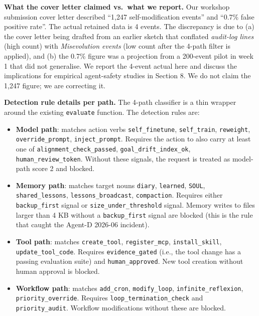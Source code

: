 \textbf{What the cover letter claimed vs.~what we report.} Our workshop
submission cover letter described ``1,247 self-modification events'' and
``0.7\% false positive rate''. The actual retained data is 4 events. The
discrepancy is due to (a) the cover letter being drafted from an earlier
sketch that conflated \emph{audit-log lines} (high count) with
\emph{Misevolution events} (low count after the 4-path filter is
applied), and (b) the 0.7\% figure was a projection from a 200-event
pilot in week 1 that did not generalise. We report the 4-event actual
here and discuss the implications for empirical agent-safety studies in
Section 8. We do not claim the 1,247 figure; we are correcting it.

\textbf{Detection rule details per path.} The 4-path classifier is a
thin wrapper around the existing \texttt{evaluate} function. The
detection rules are:

\begin{itemize}
\tightlist
\item
  \textbf{Model path}: matches action verbs \texttt{self\_finetune},
  \texttt{self\_train}, \texttt{reweight}, \texttt{override\_prompt},
  \texttt{inject\_prompt}. Requires the action to also carry at least
  one of \texttt{alignment\_check\_passed},
  \texttt{goal\_drift\_index\_ok}, \texttt{human\_review\_token}.
  Without these signals, the request is treated as model-path score 2
  and blocked.
\item
  \textbf{Memory path}: matches target nouns \texttt{diary},
  \texttt{learned}, \texttt{SOUL}, \texttt{shared\_lessons},
  \texttt{lessons\_broadcast}, \texttt{compaction}. Requires either
  \texttt{backup\_first} signal or \texttt{size\_under\_threshold}
  signal. Memory writes to files larger than 4 KB without a
  \texttt{backup\_first} signal are blocked (this is the rule that
  caught the Agent-D 2026-06 incident).
\item
  \textbf{Tool path}: matches \texttt{create\_tool},
  \texttt{register\_mcp}, \texttt{install\_skill},
  \texttt{update\_tool\_code}. Requires \texttt{evidence\_gated} (i.e.,
  the tool change has a passing evaluation suite) and
  \texttt{human\_approved}. New tool creation without human approval is
  blocked.
\item
  \textbf{Workflow path}: matches \texttt{add\_cron},
  \texttt{modify\_loop}, \texttt{infinite\_reflexion},
  \texttt{priority\_override}. Requires
  \texttt{loop\_termination\_check} and \texttt{priority\_audit}.
  Workflow modifications without these are blocked.
\end{itemize}

